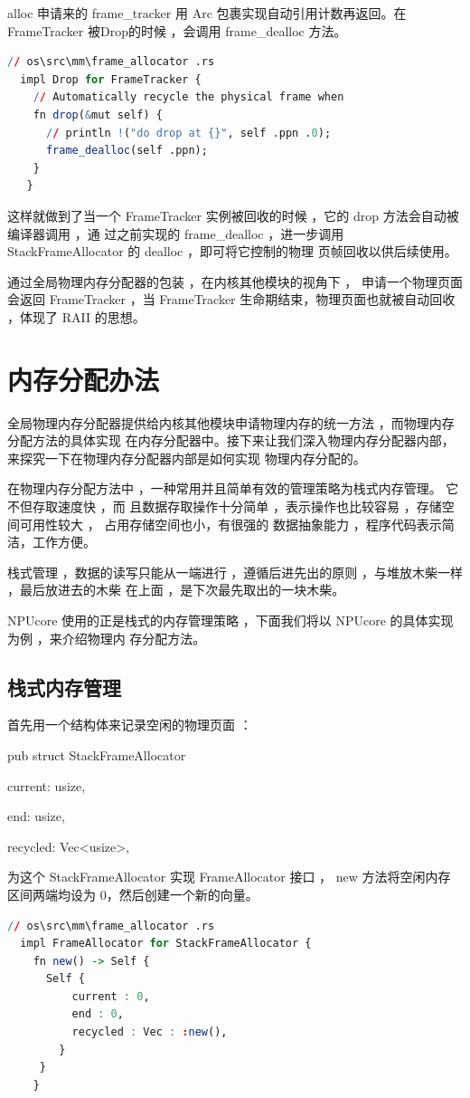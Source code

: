 	alloc 申请来的 frame\_tracker 用 Arc 包裹实现自动引用计数再返回。在 FrameTracker 被Drop的时候 ，会调用 frame\_dealloc 方法。
\begin{lstlisting}[language=R]
  // os\src\mm\frame_allocator .rs
  impl Drop for FrameTracker {
    // Automatically recycle the physical frame when
    fn drop(&mut self) {
      // println !("do drop at {}", self .ppn .0);
      frame_dealloc(self .ppn);
    }
   }
\end{lstlisting}

	这样就做到了当一个  FrameTracker 实例被回收的时候 ，它的  drop 方法会自动被编译器调用 ，通 过之前实现的  frame\_dealloc ，进一步调用 StackFrameAllocator 的 dealloc ，即可将它控制的物理 页帧回收以供后续使用。
	
	通过全局物理内存分配器的包装 ，在内核其他模块的视角下 ，  申请一个物理页面会返回 FrameTracker ，当 FrameTracker 生命期结束，物理页面也就被自动回收 ，体现了 RAII 的思想。
	\section{内存分配办法}
	全局物理内存分配器提供给内核其他模块申请物理内存的统一方法 ，而物理内存分配方法的具体实现 在内存分配器中。接下来让我们深入物理内存分配器内部，来探究一下在物理内存分配器内部是如何实现 物理内存分配的。
	
	在物理内存分配方法中 ，一种常用并且简单有效的管理策略为栈式内存管理。  它不但存取速度快 ，而 且数据存取操作十分简单 ，表示操作也比较容易 ，存储空间可用性较大 ，  占用存储空间也小，有很强的 数据抽象能力 ，程序代码表示简洁，工作方便。
	
	栈式管理 ，数据的读写只能从一端进行 ，遵循后进先出的原则 ，与堆放木柴一样 ，最后放进去的木柴 在上面 ，是下次最先取出的一块木柴。
	
	NPUcore 使用的正是栈式的内存管理策略 ，下面我们将以 NPUcore 的具体实现为例 ，来介绍物理内 存分配方法。
	\subsection{栈式内存管理}
	首先用一个结构体来记录空闲的物理页面 ：
	
	pub struct StackFrameAllocator {
		
        current: usize,     
		
        end: usize,         
		
        recycled: Vec<usize>,}
	
	为这个 StackFrameAllocator 实现 FrameAllocator 接口 ，   new 方法将空闲内存区间两端均设为 0，然后创建一个新的向量。
\begin{lstlisting}[language=R]
  // os\src\mm\frame_allocator .rs
  impl FrameAllocator for StackFrameAllocator {
    fn new() -> Self {
	  Self {
		  current : 0,
		  end : 0,
		  recycled : Vec : :new(),
	    }
	 }
    }
\end{lstlisting}
	
